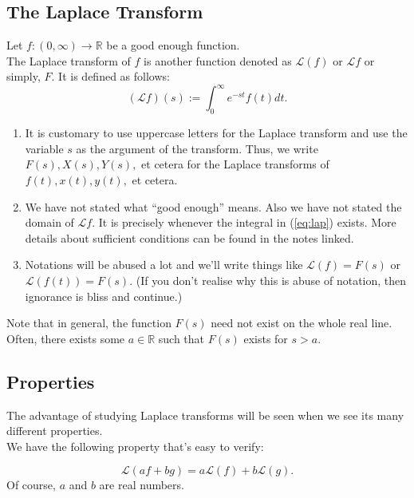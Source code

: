 \subsection{The Laplace Transform}
\begin{defn}
	Let $f:(0, \infty)\to\mathbb{R}$ be a good enough function.\\
	The Laplace transform of $f$ is another function denoted as $\mathcal{L}(f)$ or $\mathcal{L}f$ or simply, $F.$ It is defined as follows:
	\begin{equation} \label{eq:lap}
		(\mathcal{L}f)(s) := \int_{0}^{\infty} e^{-st}f(t) dt.
	\end{equation}
\end{defn}

\begin{mdframed}[style=boxstyle, frametitle={Remarks}]
	\begin{enumerate}[leftmargin=*]
		\item It is customary to use uppercase letters for the Laplace transform and use the variable $s$ as the argument of the transform. Thus, we write $F(s), X(s), Y(s),$ et cetera for the Laplace transforms of $f(t), x(t), y(t),$ et cetera.
		\item We have not stated what ``good enough'' means. Also we have not stated the domain of $\mathcal{L}f.$ It is precisely whenever the integral in (\ref{eq:lap}) exists. More details about sufficient conditions can be found in the notes linked.
		\item Notations will be abused a lot and we'll write things like $\mathcal{L}(f) = F(s)$ or $\mathcal{L}(f(t)) = F(s).$ (If you don't realise why this is abuse of notation, then ignorance is bliss and continue.)
	\end{enumerate}
\end{mdframed}

\begin{mdframed}[style=boxstyle2, frametitle={A remark}]
	Note that in general, the function $F(s)$ need not exist on the whole real line. Often, there exists some $a \in \mathbb{R}$ such that $F(s)$ exists for $s > a.$
\end{mdframed}

\newpage

\subsection{Properties}
The advantage of studying Laplace transforms will be seen when we see its many different properties.\\
We have the following property that's easy to verify:
\begin{mdframed}[style=boxstyle, frametitle={Linearity of Laplace Transforms}]
	\begin{equation*} 
		\mathcal{L}(af + bg) = a\mathcal{L}(f) + b\mathcal{L}(g).
	\end{equation*}
	Of course, $a$ and $b$ are real numbers.
\end{mdframed}

